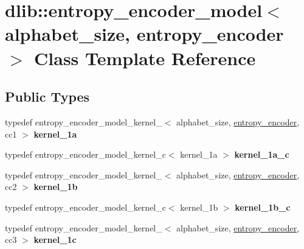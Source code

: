 \hypertarget{classdlib_1_1entropy__encoder__model}{
\section{dlib::entropy\_\-encoder\_\-model$<$ alphabet\_\-size, entropy\_\-encoder $>$ Class Template Reference}
\label{classdlib_1_1entropy__encoder__model}
}
\subsection*{Public Types}
\begin{DoxyCompactItemize}
\item 
\hypertarget{classdlib_1_1entropy__encoder__model_a127ce2530aac8ba46899b29aaf8bad86}{
typedef entropy\_\-encoder\_\-model\_\-kernel\_$<$ alphabet\_\-size, \hyperlink{classdlib_1_1entropy__encoder}{entropy\_\-encoder}, cc1 $>$ {\bfseries kernel\_\-1a}}
\label{classdlib_1_1entropy__encoder__model_a127ce2530aac8ba46899b29aaf8bad86}

\item 
\hypertarget{classdlib_1_1entropy__encoder__model_aec9d6e5bdcac8a7853eb2a7fabe54598}{
typedef entropy\_\-encoder\_\-model\_\-kernel\_\-c$<$ kernel\_\-1a $>$ {\bfseries kernel\_\-1a\_\-c}}
\label{classdlib_1_1entropy__encoder__model_aec9d6e5bdcac8a7853eb2a7fabe54598}

\item 
\hypertarget{classdlib_1_1entropy__encoder__model_a2ad3f3936f18afac3236e7258fa37251}{
typedef entropy\_\-encoder\_\-model\_\-kernel\_$<$ alphabet\_\-size, \hyperlink{classdlib_1_1entropy__encoder}{entropy\_\-encoder}, cc2 $>$ {\bfseries kernel\_\-1b}}
\label{classdlib_1_1entropy__encoder__model_a2ad3f3936f18afac3236e7258fa37251}

\item 
\hypertarget{classdlib_1_1entropy__encoder__model_ac89ba7f46967adb8b5a942b298d05bea}{
typedef entropy\_\-encoder\_\-model\_\-kernel\_\-c$<$ kernel\_\-1b $>$ {\bfseries kernel\_\-1b\_\-c}}
\label{classdlib_1_1entropy__encoder__model_ac89ba7f46967adb8b5a942b298d05bea}

\item 
\hypertarget{classdlib_1_1entropy__encoder__model_a75a1dd89362256f5da51dceb35460bdc}{
typedef entropy\_\-encoder\_\-model\_\-kernel\_$<$ alphabet\_\-size, \hyperlink{classdlib_1_1entropy__encoder}{entropy\_\-encoder}, cc3 $>$ {\bfseries kernel\_\-1c}}
\label{classdlib_1_1entropy__encoder__model_a75a1dd89362256f5da51dceb35460bdc}


\end{DoxyCompactItemize}
